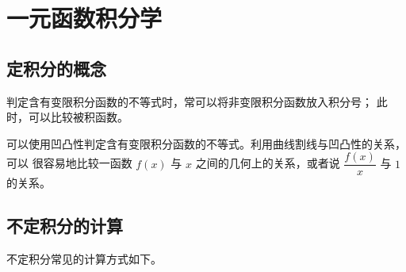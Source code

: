 \chapter{一元函数积分学}

\section{定积分的概念}

判定含有变限积分函数的不等式时，常可以将非变限积分函数放入积分号；
此时，可以比较被积函数。

可以使用凹凸性判定含有变限积分函数的不等式。利用曲线割线与凹凸性的关系，可以
很容易地比较一函数 $ f(x) $ 与 $ x $ 之间的几何上的关系，或者说 $ \dfrac{f(x)}{x} $ 与 $ 1 $ 的关系。

\section{不定积分的计算}

不定积分常见的计算方式如下。

